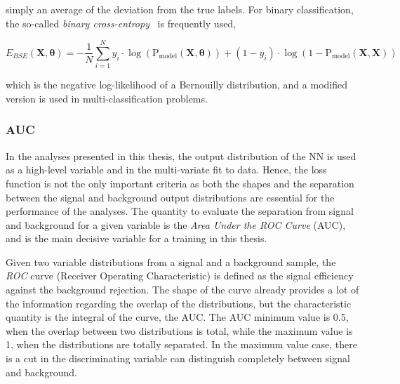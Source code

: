 simply an average of the deviation from the true labels. For binary classification, the so-called \textit{binary cross-entropy}~\cite{binarycross} is frequently used, 

\begin{equation}
    E_{BSE}(\mathbf{X},\boldsymbol{\theta}) = -\frac{1}{N}\sum_{i=1}^N y_i\cdot\log(\text{P}_\text{model}(\mathbf{X},\boldsymbol{\theta}))+(1-y_i)\cdot\log(1-\text{P}_\text{model}(\mathbf{X},\mathbf{X}))
\end{equation}

which is the negative log-likelihood of a Bernouilly distribution, and a modified version is used in multi-classification problems. 

\subsubsection{AUC}

In the analyses presented in this thesis, the output distribution of the NN is used as a high-level variable and in the  multi-variate fit to data. Hence, the loss function is not the only important criteria as both the shapes and the separation between the signal and background output distributions are essential for the performance of the analyses. The quantity to evaluate the separation from signal and background for a given variable is the \textit{Area Under the ROC Curve} (AUC), and is the main decisive variable for a training in this thesis.

Given two variable distributions from a signal and a background sample, the \textit{ROC} curve (Receiver Operating Characteristic) is defined as the signal efficiency against the background rejection. The shape of the curve already provides a lot of the information regarding the overlap of the distributions, but the characteristic quantity is the integral of the curve, the AUC. The AUC minimum value is 0.5, when the overlap between two distributions is total, while the maximum value is 1, when the distributions are totally separated. In the maximum value case, there is a cut in the discriminating variable can distinguish completely between signal and background.


